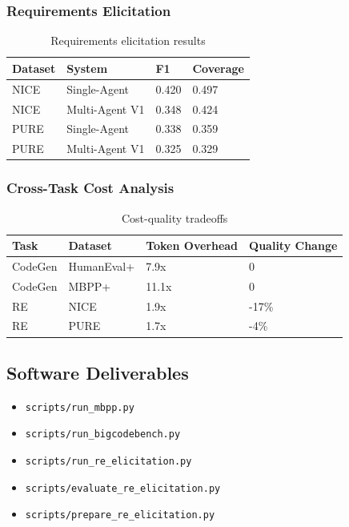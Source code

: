 \documentclass[11pt]{article}
\begin{document}
\subsubsection{Requirements Elicitation}

\begin{table}[h]
\centering
\begin{tabular}{llll}
\toprule
Dataset & System & F1 & Coverage \\
\midrule
NICE & Single-Agent & 0.420 & 0.497 \\
NICE & Multi-Agent V1 & 0.348 & 0.424 \\
PURE & Single-Agent & 0.338 & 0.359 \\
PURE & Multi-Agent V1 & 0.325 & 0.329 \\
\bottomrule
\end{tabular}
\caption{Requirements elicitation results}
\end{table}

\subsubsection{Cross-Task Cost Analysis}

\begin{table}[h]
\centering
\begin{tabular}{llll}
\toprule
Task & Dataset & Token Overhead & Quality Change \\
\midrule
CodeGen & HumanEval+ & 7.9x & 0 \\
CodeGen & MBPP+ & 11.1x & 0 \\
RE & NICE & 1.9x & -17\% \\
RE & PURE & 1.7x & -4\% \\
\bottomrule
\end{tabular}
\caption{Cost-quality tradeoffs}
\end{table}

\subsection{Software Deliverables}

\begin{itemize}
    \item \texttt{scripts/run\_mbpp.py}
    \item \texttt{scripts/run\_bigcodebench.py}
    \item \texttt{scripts/run\_re\_elicitation.py}
    \item \texttt{scripts/evaluate\_re\_elicitation.py}
    \item \texttt{scripts/prepare\_re\_elicitation.py}
\end{itemize}
\end{document}
